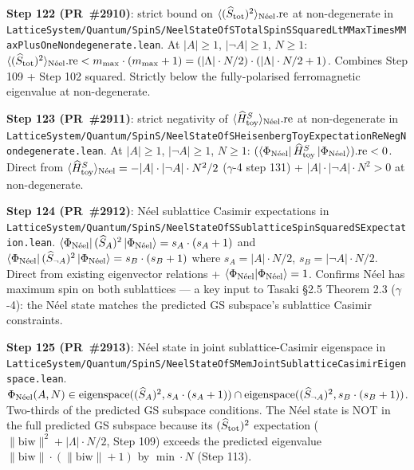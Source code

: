 \documentclass[a4paper,11pt]{article}
\begin{document}
\textbf{Step 122 (PR~\#2910)}: strict bound on
$\langle(\widehat S_{\rm tot})^2\rangle_{\rm N\acute{e}el}.\mathrm{re}$
at non-degenerate in
\texttt{LatticeSystem/Quantum/SpinS/NeelStateOfSTotalSpinSSquaredLtMMaxTimesMMaxPlusOneNondegenerate.lean}.
At $|A| \ge 1$, $|\neg A| \ge 1$, $N \ge 1$:
$\langle(\widehat S_{\rm tot})^2\rangle_{\rm N\acute{e}el}.\mathrm{re}
   < m_{\rm max}\cdot(m_{\rm max} + 1) = (|\Lambda|\cdot N/2)\cdot
   (|\Lambda|\cdot N/2 + 1)$.
Combines Step 109 + Step 102 squared. Strictly below the
fully-polarised ferromagnetic eigenvalue at non-degenerate.

\textbf{Step 123 (PR~\#2911)}: strict negativity of
$\langle\widehat H_{\rm toy}^S\rangle_{\rm N\acute{e}el}.\mathrm{re}$
at non-degenerate in
\texttt{LatticeSystem/Quantum/SpinS/NeelStateOfSHeisenbergToyExpectationReNegNondegenerate.lean}.
At $|A| \ge 1$, $|\neg A| \ge 1$, $N \ge 1$:
$(\langle\Phi_{\rm N\acute{e}el} |\,\widehat H_{\rm toy}^S\,
   | \Phi_{\rm N\acute{e}el}\rangle).\mathrm{re} < 0$.
Direct from $\langle\widehat H_{\rm toy}^S\rangle_{\rm N\acute{e}el} =
-|A|\cdot|\neg A|\cdot N^2/2$ ($\gamma$-4 step 131) +
$|A|\cdot|\neg A|\cdot N^2 > 0$ at non-degenerate.

\textbf{Step 124 (PR~\#2912)}: N\'eel sublattice Casimir expectations
in
\texttt{LatticeSystem/Quantum/SpinS/NeelStateOfSSublatticeSpinSquaredSExpectation.lean}.
$\langle\Phi_{\rm N\acute{e}el} |\,(\widehat S_A)^2\,
   | \Phi_{\rm N\acute{e}el}\rangle = s_A\cdot(s_A+1)$ and
$\langle\Phi_{\rm N\acute{e}el} |\,(\widehat S_{\neg A})^2\,
   | \Phi_{\rm N\acute{e}el}\rangle = s_B\cdot(s_B+1)$
where $s_A = |A|\cdot N/2$, $s_B = |\neg A|\cdot N/2$. Direct from
existing eigenvector relations + $\langle\Phi_{\rm N\acute{e}el}|
\Phi_{\rm N\acute{e}el}\rangle = 1$. Confirms N\'eel has maximum
spin on both sublattices --- a key input to Tasaki §2.5
Theorem 2.3 ($\gamma$-4): the N\'eel state matches the predicted GS
subspace's sublattice Casimir constraints.

\textbf{Step 125 (PR~\#2913)}: N\'eel state in joint sublattice-Casimir
eigenspace in
\texttt{LatticeSystem/Quantum/SpinS/NeelStateOfSMemJointSublatticeCasimirEigenspace.lean}.
$\Phi_{\rm N\acute{e}el}(A, N) \in
   \mathrm{eigenspace}((\widehat S_A)^2, s_A\cdot(s_A+1)) \cap
   \mathrm{eigenspace}((\widehat S_{\neg A})^2, s_B\cdot(s_B+1))$.
Two-thirds of the predicted GS subspace conditions. The N\'eel
state is NOT in the full predicted GS subspace because its
$(\widehat S_{\rm tot})^2$ expectation ($\|\mathrm{biw}\|^2 +
|\Lambda|\cdot N/2$, Step 109) exceeds the predicted eigenvalue
$\|\mathrm{biw}\|\cdot(\|\mathrm{biw}\|+1)$ by $\min\cdot N$
(Step 113).
\end{document}
